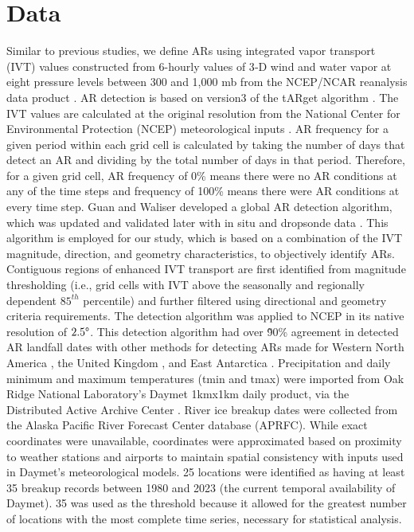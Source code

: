 \documentclass[draft]{AR_analysis_}
\begin{document}
\section{Data}

Similar to previous studies, we define ARs using integrated vapor
transport (IVT) values constructed from 6-hourly values of 3‐D wind and
water vapor at eight pressure levels between 300 and 1,000
mb from the NCEP/NCAR reanalysis data product \cite{NCEP_NCAR_reanalysis}. 
AR detection is based on version3 of the tARget algorithm
\cite{Guan_Waliser2019, bin2022}.
The IVT values are calculated at the original
resolution from the National Center for Environmental Protection (NCEP)
meteorological inputs \cite{NCEP_reanalysis}. AR frequency for a given
period within each grid cell is calculated by taking the number of days
that detect an AR and dividing by the total number of days in that
period. Therefore, for a given grid cell, AR frequency of 0\% means
there were no AR conditions at any of the time steps and frequency of
100\% means there were AR conditions at every time step. Guan and
Waliser \cite{alg_for_detecting_AR_moisture_fluxes} developed a global
AR detection algorithm, which was updated and validated later with in
situ and dropsonde data \cite{bin2022}. This algorithm is employed for
our study, which is based on a combination of the IVT magnitude,
direction, and geometry characteristics, to objectively identify ARs.
Contiguous regions of enhanced IVT transport are first identified from
magnitude thresholding (i.e., grid cells with IVT above the seasonally
and regionally dependent $85^{th}$ percentile) and further filtered
using directional and geometry criteria requirements. The detection
algorithm was applied to NCEP in its native resolution of $2.5 \degree$.
This detection algorithm had over \~90\% agreement in detected AR
landfall dates with other methods for detecting ARs made for Western
North America \cite{Neiman2008}, the United Kingdom \cite{Lavers2011}, 
and East Antarctica \cite{Gorodetskaya2014}. Precipitation and daily
minimum and maximum temperatures (tmin and tmax) were imported from Oak Ridge National
Laboratory's Daymet 1kmx1km daily product, via the
Distributed Active Archive Center \cite{daymet}. River ice breakup dates 
were collected from the Alaska Pacific River Forecast Center database 
(APRFC). While exact coordinates were unavailable, coordinates were 
approximated based on proximity to weather stations and airports to 
maintain spatial consistency with inputs used in Daymet’s meteorological 
models. 25 locations were identified as having at least 35 breakup 
records between 1980 and 2023 (the current temporal availability of 
Daymet). 35 was used as the threshold because it allowed for the greatest 
number of locations with the most complete time series, 
necessary for statistical analysis.
\end{document}
